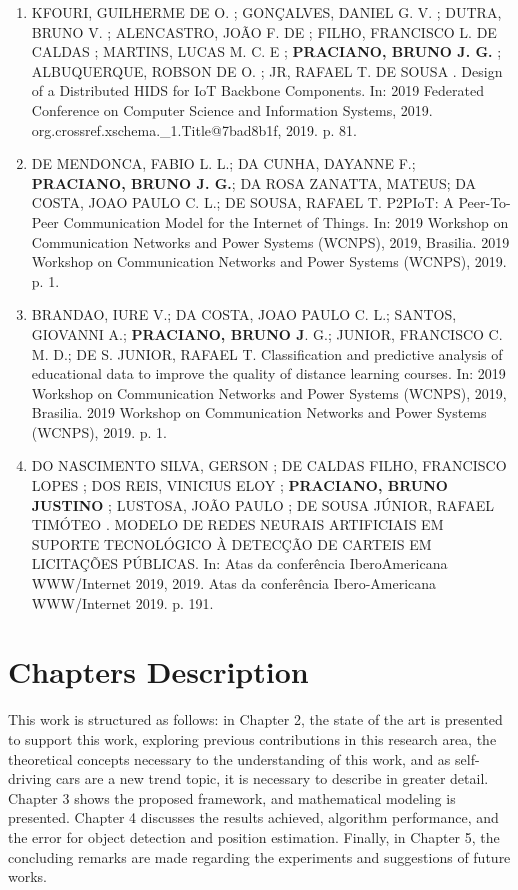 \begin{enumerate}
\item KFOURI, GUILHERME DE O. ; GONÇALVES, DANIEL G. V. ; DUTRA, BRUNO V. ; ALENCASTRO, JOÃO F. DE ; FILHO, FRANCISCO L. DE CALDAS ; MARTINS, LUCAS M. C. E ; \textbf{PRACIANO, BRUNO J. G.} ; ALBUQUERQUE, ROBSON DE O. ; JR, RAFAEL T. DE SOUSA . Design of a Distributed HIDS for IoT Backbone Components. In: 2019 Federated Conference on Computer Science and Information Systems, 2019. org.crossref.xschema.\_1.Title@7bad8b1f, 2019. p. 81.

\item DE MENDONCA, FABIO L. L.; DA CUNHA, DAYANNE F.; \textbf{PRACIANO, BRUNO J. G.}; DA ROSA ZANATTA, MATEUS; DA COSTA, JOAO PAULO C. L.; DE SOUSA, RAFAEL T. P2PIoT: A Peer-To-Peer Communication Model for the Internet of Things. In: 2019 Workshop on Communication Networks and Power Systems (WCNPS), 2019, Brasilia. 2019 Workshop on Communication Networks and Power Systems (WCNPS), 2019. p. 1.

\item BRANDAO, IURE V.; DA COSTA, JOAO PAULO C. L.; SANTOS, GIOVANNI A.; \textbf{PRACIANO, BRUNO J}. G.; JUNIOR, FRANCISCO C. M. D.; DE S. JUNIOR, RAFAEL T. Classification and predictive analysis of educational data to improve the quality of distance learning courses. In: 2019 Workshop on Communication Networks and Power Systems (WCNPS), 2019, Brasilia. 2019 Workshop on Communication Networks and Power Systems (WCNPS), 2019. p. 1.


\item DO NASCIMENTO SILVA, GERSON ; DE CALDAS FILHO, FRANCISCO LOPES ; DOS REIS, VINICIUS ELOY ; \textbf{PRACIANO, BRUNO JUSTINO }; LUSTOSA, JOÃO PAULO ; DE SOUSA JÚNIOR, RAFAEL TIMÓTEO . MODELO DE REDES NEURAIS ARTIFICIAIS EM SUPORTE TECNOLÓGICO À DETECÇÃO DE CARTEIS EM LICITAÇÕES PÚBLICAS. In: Atas da conferência IberoAmericana WWW/Internet 2019, 2019. Atas da conferência Ibero-Americana WWW/Internet 2019. p. 191.

\end{enumerate}

\section{Chapters Description}

This work is structured as follows: in Chapter 2, the state of the art is presented to support this work, exploring previous contributions in this research area, the theoretical concepts necessary to the understanding of this work, and as self-driving cars are a new trend topic, it is necessary to describe in greater detail.  Chapter 3 shows the proposed framework, and mathematical modeling is presented. Chapter 4 discusses the results achieved, algorithm performance, and the error for object detection and position estimation. Finally, in Chapter 5, the concluding remarks are made regarding the experiments and suggestions of future works.


